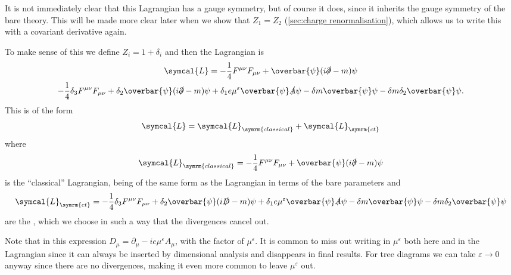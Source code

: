 \documentclass[fleqn]{NotesClass}
\newcommand{\diracadjoint}[1]{\overbar{#1}}
\newcommand{\covariantDerivative}{D}
\newcommand{\lagrangianDensity}{\symcal{L}}
\begin{document}
    It is not immediately clear that this Lagrangian has a gauge symmetry, but of course it does, since it inherits the gauge symmetry of the bare theory.
    This will be made more clear later when we show that \(Z_1 = Z_2\) (\cref{sec:charge renormalisation}), which allows us to write this with a covariant derivative again.
    
    To make sense of this we define \(Z_i = 1 + \delta_i\) and then the Lagrangian is
    \begin{multline}
        \lagrangianDensity = -\frac{1}{4}F^{\mu\nu}F_{\mu\nu} + \diracadjoint{\psi}(i\slashed{\partial} - m)\psi\\
        - \frac{1}{4}\delta_3 F^{\mu\nu} F_{\mu\nu} + \delta_2 \diracadjoint{\psi}(i\slashed{\partial} - m)\psi + \delta_1 e\mu^{\varepsilon}\diracadjoint{\psi}\slashed{A}\psi - \delta m\diracadjoint{\psi} \psi - \delta m \delta_2 \diracadjoint{\psi} \psi.
    \end{multline}
    This is of the form
    \begin{equation}
        \lagrangianDensity = \lagrangianDensity_{\symrm{classical}} + \lagrangianDensity_{\symrm{ct}}
    \end{equation}
    where
    \begin{equation}
        \lagrangianDensity_{\symrm{classical}} = -\frac{1}{4}F^{\mu\nu}F_{\mu\nu} + \diracadjoint{\psi}(i\slashed{\partial} - m)\psi
    \end{equation}
    is the \enquote{classical} Lagrangian, being of the same form as the Lagrangian in terms of the bare parameters and
    \begin{equation}
        \lagrangianDensity_{\symrm{ct}} = -\frac{1}{4}\delta_3 F^{\mu\nu} F_{\mu\nu} + \delta_2 \diracadjoint{\psi}(i\slashed{\covariantDerivative} - m)\psi + \delta_1 e\mu^{\varepsilon}\diracadjoint{\psi}\slashed{A}\psi - \delta m\diracadjoint{\psi} \psi - \delta m \delta_2 \diracadjoint{\psi} \psi
    \end{equation}
    are the , which we choose in such a way that the divergences cancel out.
    
    Note that in this expression \(\covariantDerivative_\mu = \partial_\mu - ie\mu^{\varepsilon}A_\mu\), with the factor of \(\mu^\varepsilon\).
    It is common to miss out writing in \(\mu^\varepsilon\) both here and in the Lagrangian since it can always be inserted by dimensional analysis and disappears in final results.
    For tree diagrams we can take \(\varepsilon \to 0\) anyway since there are no divergences, making it even more common to leave \(\mu^\varepsilon\) out.
    
\end{document}
